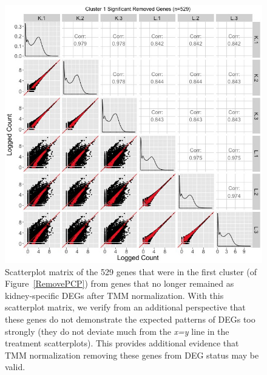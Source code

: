 \documentclass{article}
\begin{document}
\null
\begin{figure}[t!]
\centerline{\includegraphics[width=1\columnwidth]{../Bioinformatics/Pictures/liverKidney/Clustering_data_FDR_001_TMMvRaw_Removed/K_L_Sig_SM_Removed_8_1.jpg}}
\caption{Scatterplot matrix of the 529 genes that were in the first cluster (of Figure~\ref{RemovePCP}) from genes that no longer remained as kidney-specific DEGs after TMM normalization. With this scatterplot matrix, we verify from an additional perspective that these genes do not demonstrate the expected patterns of DEGs too strongly (they do not deviate much from the \textit{x=y} line in the treatment scatterplots). This provides additional evidence that TMM normalization removing these genes from DEG status may be valid.
\label{RemovedSM}}
\end{figure}
\end{document}

